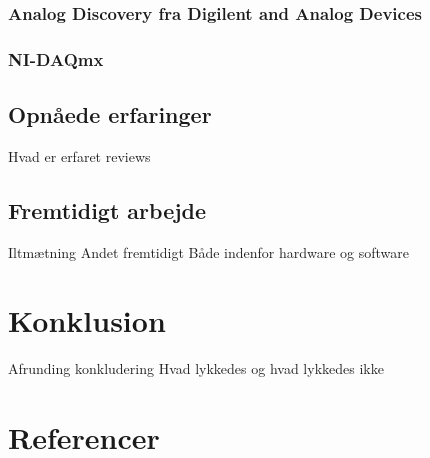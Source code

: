 \subsection{Analog Discovery fra Digilent and Analog Devices}
\subsection{NI-DAQmx}

\section{Opnåede erfaringer}
Hvad er erfaret
reviews
\section{Fremtidigt arbejde}
Iltmætning
Andet fremtidigt
Både indenfor hardware og software
\chapter{Konklusion}
Afrunding
konkludering
Hvad lykkedes og hvad lykkedes ikke
\chapter{Referencer}
